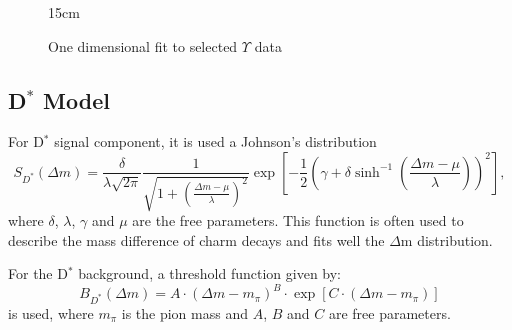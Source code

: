 \begin{figure}[!htm]{15cm}
  \caption{One dimensional fit to selected $\Upsilon$ data}%
  \label{fig:fit1D_upsilon}
\end{figure}

\subsection{\texorpdfstring{D$^{*}$}{D*} Model}

For D$^*$ signal component, it is used a Johnson's distribution
\begin{equation}\label{eq:dstar_sig}
  S_{D^*}(\Delta m) = \frac{\delta}{\lambda\sqrt{2\pi}} \frac{1}{\sqrt{1 + \left(\frac{\Delta m-\mu}{\lambda}\right)^2}}\exp{\left[-\frac{1}{2}\left(\gamma+\delta\sinh^{-1}\left(\frac{\Delta m-\mu}{\lambda}\right)\right)^2\right]},
\end{equation}
where $\delta$, $\lambda$, $\gamma$ and $\mu$ are the free parameters. This function is often used to describe the mass difference of charm decays and fits well the $\Delta$m distribution.

For the D$^*$ background, a threshold function \cite{ZEUS:2013fws} given by:
\begin{equation} \label{eq:dstar_bkg}
  B_{D^*}(\Delta m) = A \cdot (\Delta m - m_\pi)^B \cdot \exp[C\cdot (\Delta m-m_\pi)]
\end{equation}
is used, where $m_\pi$ is the pion mass and $A$, $B$ and $C$ are free parameters.

